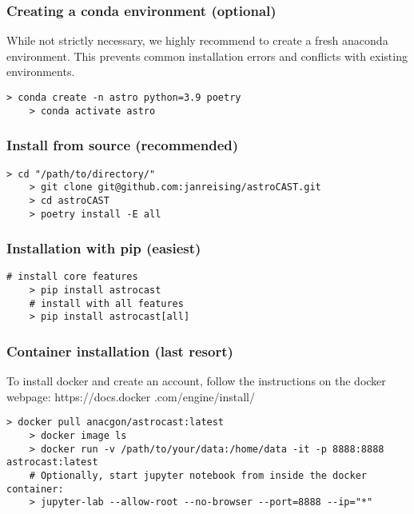 \subsubsection{Creating a conda environment (optional)}
While not strictly necessary, we highly recommend to create a fresh anaconda environment. This
prevents common installation errors and conflicts with existing environments.

\begin{lstlisting}[style=bashStyle]
    > conda create -n astro python=3.9 poetry
    > conda activate astro
\end{lstlisting}

\subsubsection{Install from source (recommended)}
\label{res:install-from-source}
\begin{lstlisting}[style=bashStyle]
    > cd "/path/to/directory/"
    > git clone git@github.com:janreising/astroCAST.git
    > cd astroCAST
    > poetry install -E all
\end{lstlisting}

\subsubsection{Installation with pip (easiest)}
\begin{lstlisting}[style=bashStyle]
    # install core features
    > pip install astrocast
    # install with all features
    > pip install astrocast[all]
\end{lstlisting}

\subsubsection{Container installation (last resort)}

To install docker and create an account, follow the instructions on the docker webpage: https://docs.docker
.com/engine/install/

\begin{lstlisting}[style=bashStyle]
    > docker pull anacgon/astrocast:latest
    > docker image ls
    > docker run -v /path/to/your/data:/home/data -it -p 8888:8888 astrocast:latest
    # Optionally, start jupyter notebook from inside the docker container:
    > jupyter-lab --allow-root --no-browser --port=8888 --ip="*"
\end{lstlisting}

